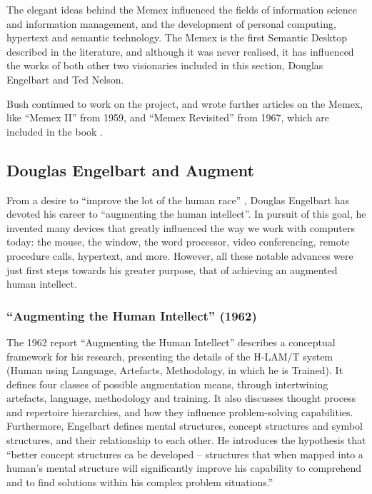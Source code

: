 The elegant ideas behind the Memex influenced the fields of information science and information management, and the development of personal computing, hypertext and semantic technology. The Memex is the first Semantic Desktop described in the literature, and although it was never realised, it has influenced the works of both other two visionaries included in this section, Douglas Engelbart and Ted Nelson.

Bush continued to work on the project, and wrote further articles on the Memex, like ``Memex II'' from 1959, and ``Memex Revisited'' from 1967, which are included in the book \cite{Nyce1991}.

\subsection{Douglas Engelbart and Augment}
\label{sub:engelbart}

From a desire to ``improve the lot of the human race'' \cite{Goldberg1988}, Douglas Engelbart has devoted his career to ``augmenting the human intellect''. In pursuit of this goal, he invented many devices that greatly influenced the way we work with computers today: the mouse, the window, the word processor, video conferencing, remote procedure calls, hypertext, and more. However, all these notable advances were just first steps towards his greater purpose, that of achieving an augmented human intellect.

\subsubsection{``Augmenting the Human Intellect'' (1962)}

The 1962 report ``Augmenting the Human Intellect'' \cite{Engelbart1962} describes a conceptual framework for his research, presenting the details of the H-LAM/T system (Human using Language, Artefacts, Methodology, in which he is Trained). It defines four classes of possible augmentation means, through intertwining artefacts, language, methodology and training. It also discusses thought process and repertoire hierarchies, and how they influence problem-solving capabilities. Furthermore, Engelbart defines mental structures, concept structures and symbol structures, and their relationship to each other. He introduces the hypothesis that ``better concept structures ca be developed -- structures that when mapped into a human's mental structure will significantly improve his capability to comprehend and to find solutions within his complex problem situations.''

